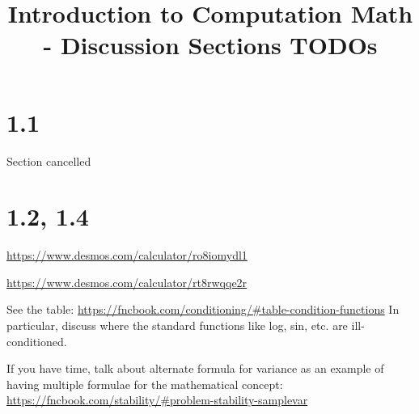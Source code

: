 \documentclass{article}
\begin{document}
    \title{Introduction to Computation Math - Discussion Sections TODOs}

    \section{1.1}
    Section cancelled

    \section{1.2, 1.4}

    \url{https://www.desmos.com/calculator/ro8iomydl1}
    
    \url{https://www.desmos.com/calculator/rt8rwqqe2r}

    See the table: \url{https://fncbook.com/conditioning/#table-condition-functions}
    In particular, discuss where the standard functions like log, sin, etc. are ill-conditioned.

    If you have time, talk about alternate formula for variance as an example of having multiple formulae for the mathematical concept: \url{https://fncbook.com/stability/#problem-stability-samplevar}
    
\end{document}
